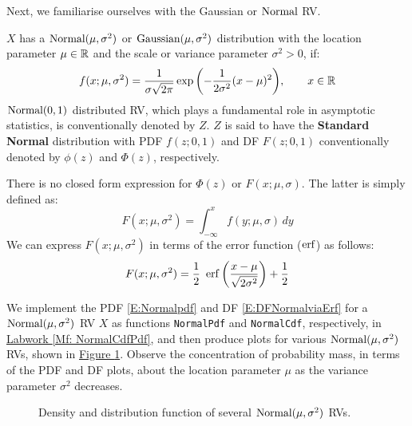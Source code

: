 Next, we familiarise ourselves with the Gaussian or $\mbox{{\rm Normal}}$ RV.
\begin{model}
$X$ has a $\mbox{{\rm Normal}}(\mu,\sigma^2)$ or $\mbox{{\rm Gaussian}}(\mu,\sigma^2)$ distribution with the location parameter $\mu \in \mathbb{R}$ and the scale or variance parameter $\sigma^2 > 0$, if:
\begin{equation}\label{E:Normalpdf}
f(x; \mu, \sigma^2) = \frac{1}{\sigma \sqrt{2 \pi}}
 \exp{\left( - \frac{1}{2 \sigma^2} (x-\mu)^2 \right)}, \qquad x \in \mathbb{R}
\end{equation}
$\mbox{{\rm Normal}}(0,1)$ distributed RV, which plays a fundamental role in asymptotic statistics, is conventionally denoted by $Z$.  $Z$ is said to have the {\bf Standard Normal} distribution with PDF $f(z; 0,1)$ and DF $F(z;0,1)$ conventionally denoted by $\phi(z)$ and $\Phi(z)$, respectively.

There is no closed form expression for $\Phi(z)$ or $F(x;\mu,\sigma)$.  The latter is simply defined as:
\[
F(x;\mu,\sigma^2) = \int_{-\infty}^x f(y;\mu,\sigma)\,dy
\]
We can express $F(x;\mu,\sigma^2)$ in terms of the error function ($\operatorname{erf}$) as follows:
\begin{equation}\label{E:DFNormalviaErf}
F(x;\mu,\sigma^2) = \frac{1}{2} \ \operatorname{erf} \left(  \frac{x-\mu}{\sqrt{2 \sigma^2}} \right)+ \frac{1}{2}
\end{equation}
\end{model}
We 
implement the PDF \eqref{E:Normalpdf} and DF \eqref{E:DFNormalviaErf} for a $\mbox{{\rm Normal}}(\mu,\sigma^2)$ RV $X$ as \Matlab functions {\tt NormalPdf} and {\tt NormalCdf}, respectively, in \hyperref[Mf: NormalCdfPdf]{Labwork \ref*{Mf: NormalCdfPdf}},  and then 
produce plots for various $\mbox{{\rm Normal}}(\mu,\sigma^2)$ RVs, shown in \hyperref[F:plotPdfCdfNormals]{Figure \ref*{F:plotPdfCdfNormals}}.  Observe the concentration of probability mass, in terms of the PDF and DF plots, about the location parameter $\mu$ as the variance parameter $\sigma^2$ decreases.
\begin{figure}[htpb]
\caption{Density and distribution function of several $\mbox{{\rm Normal}}(\mu,\sigma^2)$ RVs.\label{F:plotPdfCdfNormals}}
\centering   {}
\end{figure}

